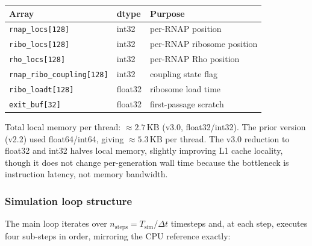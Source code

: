 \documentclass[11pt]{article}
\begin{document}
\begin{center}
\small
\begin{tabular}{lll}
\toprule
Array & dtype & Purpose \\
\midrule
\texttt{rnap\_locs[128]} & int32 & per-RNAP position \\
\texttt{ribo\_locs[128]} & int32 & per-RNAP ribosome position \\
\texttt{rho\_locs[128]}  & int32 & per-RNAP Rho position \\
\texttt{rnap\_ribo\_coupling[128]} & int32 & coupling state flag \\
\texttt{ribo\_loadt[128]}  & float32 & ribosome load time \\
\texttt{exit\_buf[32]}    & float32 & first-passage scratch \\
\bottomrule
\end{tabular}
\end{center}

Total local memory per thread: $\approx 2.7\,\text{KB}$ (v3.0, float32/int32).
The prior version (v2.2) used float64/int64, giving $\approx 5.3\,\text{KB}$
per thread. The v3.0 reduction to float32 and int32 halves local memory,
slightly improving L1 cache locality, though it does not change per-generation
wall time because the bottleneck is instruction latency, not memory bandwidth.

\subsubsection*{Simulation loop structure}

The main loop iterates over $n_{\text{steps}} = T_{\text{sim}}/\Delta t$
timesteps and, at each step, executes four sub-steps in order, mirroring the
CPU reference exactly:
\end{document}

